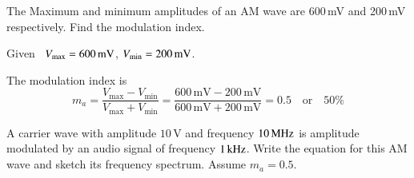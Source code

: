 \eject

\begin{example}\label{exam9.10}
The Maximum and minimum amplitudes of an AM wave are 600\,mV and 200\,mV respectively. Find the modulation index.
\end{example}

\begin{solution}
Given \ $V_{\max}=600\text{\,mV}$, $V_{\min}=200\text{\,mV}$.

The modulation index is
$$
m_{a}=\dfrac{V_{\max}-V_{\min}}{V_{\max}+V_{\min}}=\frac{600\,\text{mV}-200\,\text{mV}}{600\,\text{mV}+200\,\text{mV}}=0.5\text{~~ or~~ } 50\%
$$
\end{solution}

\begin{example}\label{exam9.11}
A carrier wave with amplitude $10\,\text{V}$ and frequency $10\text{\,MHz}$ is amplitude modulated by an audio signal of frequency $1\text{\,kHz}$. Write the equation for this AM wave and sketch its frequency spectrum. Assume $m_{a}=0.5$.
\end{example}

